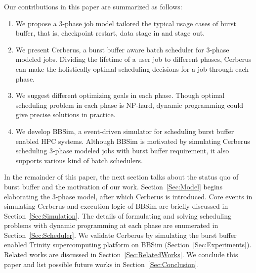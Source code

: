 Our contributions in this paper are summarized as follows:
\begin{enumerate}
        \item %
                We propose a 3-phase job model tailored the typical
                usage cases of burst buffer, that is, checkpoint restart,
                data stage in and stage out.
        \item   We present Cerberus,
                a burst buffer aware batch scheduler for 3-phase modeled jobs.
                Dividing the lifetime of a user job to different phases,
                Cerberus can make the holistically optimal scheduling decisions 
                for a job through each phase.
        \item   We suggest different optimizing goals in each phase.
                Though optimal scheduling problem in each phase is NP-hard,
                dynamic programming could give precise solutions
                in practice.
        \item   We develop BBSim, a event-driven simulator for scheduling
                burst buffer enabled HPC systems.
                Although BBSim is motivated by simulating Cerberus scheduling 
                3-phase modeled jobs with burst buffer requirement,
                it also supports various kind of batch schedulers.
\end{enumerate}


In the remainder of this paper,
the next section talks about the status quo of burst buffer and
the motivation of our work.
Section~\ref{Sec:Model} begins elaborating the 3-phase model,
after which Cerberus is introduced.
Core events in simulating Cerberus and execution logic of BBSim are
briefly discussed in Section~\ref{Sec:Simulation}.
The details of formulating and solving scheduling problems with
dynamic programming at each phase are enumerated in Section~\ref{Sec:Scheduler}.
We validate Cerberus by simulating the burst buffer enabled
Trinity supercomputing platform on BBSim (Section~\ref{Sec:Experiments}).
Related works are discussed in Section~\ref{Sec:RelatedWorks}.
We conclude this paper and list possible future works in Section~\ref{Sec:Conclusion}.



